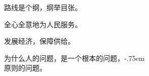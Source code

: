 \null%
\vspace{1.5\baselineskip}
\sffamily

\begin{center}
{%
	\huge\bfseries%
}
\end{center}

\begingroup%
\Large%
\doublespacing%
\setlength{\parindent}{2em}%

路线是个纲，纲举目张。

全心全意地为人民服务。

发展经济，保障供给。

为什么人的问题，是一个根本的问题，\kern-.75em\\
原则的问题。

\endgroup

